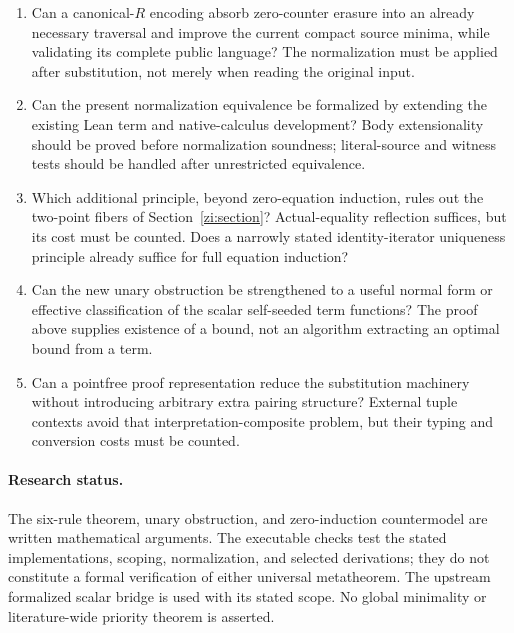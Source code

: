 \documentclass[11pt]{article}
\theoremstyle{definition}
\begin{document}
\begin{enumerate}[leftmargin=*]
\item Can a canonical-$R$ encoding absorb zero-counter erasure into an
already necessary traversal and improve the current compact source minima,
while validating its complete public language? The normalization must be
applied after substitution, not merely when reading the original input.
\item Can the present normalization equivalence be formalized by extending
the existing Lean term and native-calculus development? Body extensionality
should be proved before normalization soundness; literal-source and
witness tests should be handled after unrestricted equivalence.
\item Which additional principle, beyond zero-equation induction, rules out
the two-point fibers of Section~\ref{zi:section}? Actual-equality reflection
suffices, but its cost must be counted. Does a narrowly stated
identity-iterator uniqueness principle already suffice for full equation
induction?
\item Can the new unary obstruction be strengthened to a useful normal
form or effective classification of the scalar self-seeded term functions?
The proof above supplies existence of a bound, not an algorithm extracting
an optimal bound from a term.
\item Can a pointfree proof representation reduce the substitution
machinery without introducing arbitrary extra pairing structure? External
tuple contexts avoid that interpretation-composite problem, but their
typing and conversion costs must be counted.
\end{enumerate}

\paragraph{Research status.}
The six-rule theorem, unary obstruction, and zero-induction countermodel are written mathematical
arguments. The executable checks test the stated implementations, scoping,
normalization, and selected derivations; they do not constitute a formal
verification of either universal metatheorem. The upstream formalized
scalar bridge is used with its stated scope. No global minimality or
literature-wide priority theorem is asserted.



\clearpage\appendix
\end{document}
